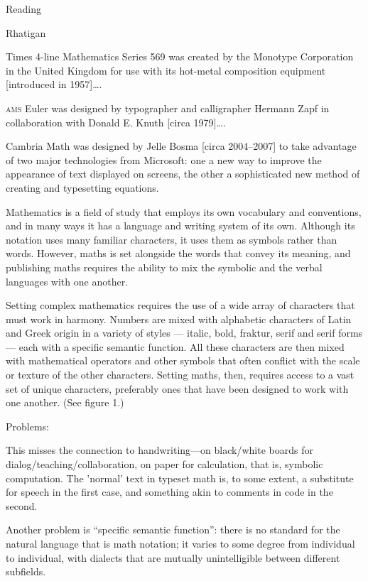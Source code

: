 \documentclass[11pt]{PalisadesLakesBook}
\begin{document}
\begin{plSection}{Reading}
\begin{plSection}{Rhatigan}
\begin{plSection}{}
\begin{plQuote}{}{}
Times 4-line Mathematics Series 569 was created by the Monotype
Corporation in the United Kingdom for use with its hot-metal
composition equipment [introduced in 1957]{\ldots}.

\textsc{ams} Euler was designed by typographer and
calligrapher Hermann Zapf in collaboration with Donald E. Knuth
[circa 1979]{\ldots}.

Cambria Math was designed by Jelle Bosma [circa 2004--2007]
to take advantage of two major technologies from Microsoft: 
one a new way to improve the appearance of text 
displayed on screens, 
the other a sophisticated new method 
of creating and typesetting equations.
\end{plQuote}

\begin{plQuote}{}{}
Mathematics is a field of study that employs its own vocabulary 
and conventions, and in many ways it has a language 
and writing system of its own. 
Although its notation uses many familiar characters, 
it uses them as symbols rather than words. 
However, maths is set alongside the words that convey its meaning, 
and publishing maths requires the ability to mix the symbolic 
and the verbal languages with one another.

Setting complex mathematics requires the use of a wide array 
of characters that must work in harmony. 
Numbers are mixed with alphabetic characters 
of Latin and Greek origin in a variety of styles — 
italic, bold, fraktur, serif and serif forms — 
each with a specific semantic function. 
All these characters are then mixed 
with mathematical operators and other symbols 
that often conflict with the scale or texture 
of the other characters. 
Setting maths, then, requires access to a vast set 
of unique characters, preferably ones 
that have been designed to work with one another. 
(See figure 1.)
\end{plQuote}

Problems:

This misses the connection to handwriting---on black/white boards
for dialog/teaching/collaboration, on paper for calculation, 
that is, symbolic computation.
The 'normal' text in typeset math
is, to some extent, a substitute for speech in the first case,
and something akin to comments in code in the second.

Another problem is ``specific semantic function'': 
there is no standard for the natural language that is 
math notation; 
it varies to some degree from individual to individual,
with dialects that are mutually unintelligible 
between different subfields.


\end{plSection}
\end{plSection}
\end{plSection}
\end{document}
